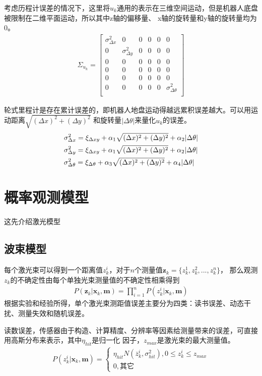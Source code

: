 \documentclass[10pt]{article}
\begin{document}
考虑历程计误差的情况下，这里将$u_k$通用的表示在三维空间运动，但是机器人底盘被限制在二维平面运动，所以其中z轴的偏移量、
x轴的旋转量和y轴的旋转量均为0。
\begin{align} 
    \Sigma_{u_k}=\left[\begin{array}{cccccc}
        \sigma_{\Delta x}^{2} & 0 & 0 & 0 & 0 & 0 \\
        0 & \sigma_{\Delta y}^{2} & 0 & 0 & 0 & 0 \\
        0 & 0 & 0 & 0 & 0 & 0 \\
        0 & 0 & 0 & 0 & 0 & 0 \\
        0 & 0 & 0 & 0 & 0 & 0 \\
        0 & 0 & 0 & 0 & 0 & \sigma_{\Delta\theta}^{2} \\
    \end{array}\right]
\end{align}

轮式里程计是存在累计误差的，即机器人地盘运动得越远累积误差越大。可以用运动距离$\sqrt{(\Delta x)^{2}+(\Delta y)^{2}}$
和旋转量$|\Delta \theta|$来量化$u_k$的误差。
\begin{align} 
    &\sigma_{\Delta x}^{2}=\xi_{\Delta xy}+\alpha_{1}\sqrt{(\Delta x)^{2}+(\Delta y)^{2}} + \alpha_{2}|\Delta \theta| \notag \\
    &\sigma_{\Delta y}^{2}=\xi_{\Delta xy}+\alpha_{1}\sqrt{(\Delta x)^{2}+(\Delta y)^{2}} + \alpha_{2}|\Delta \theta| \\
    &\sigma_{\Delta \theta}^{2}=\xi_{\Delta \theta}+\alpha_{3}\sqrt{(\Delta x)^{2}+(\Delta y)^{2}} + \alpha_{4}|\Delta \theta| \notag
\end{align}    
\section{概率观测模型} 
这先介绍激光模型
\subsection{波束模型}
每个激光束可以得到一个距离值$z_{k}^{i}$，对于$n$个测量值$\mathbf{z}_{k}=\{z_{k}^{1},z_{k}^{2},...,z_{k}^{n}\}$，
那么观测$z_k$的不确定性由每个单独光束测量值的不确定性相乘得到
\begin{align} 
    P(\mathbf{z}_k | \mathbf{x}_k,\mathbf{m})=\prod_{i=1}^{n}P(z_{k}^{i} | \mathbf{x}_k,\mathbf{m})
\end{align} 
根据实验和经验所得，单个激光束测距值误差主要分为四类：读书误差、动态干扰、测量失效和随机误差。

读数误差，传感器由于构造、计算精度、分辨率等因素给测量带来的误差，可直接用高斯分布来表示，其中$\eta_{hit}$是归一化
因子，$z_{max}$是激光束的最大测量值。
\begin{align}  
    P(z_{k}^{i} | \mathbf{x}_k,\mathbf{m}) =\left\{\begin{array}{l}\eta_{hit}N(\overline{z}_{k}^{i},
    \sigma_{hit}^{2}),0\leq z_{k}^{i} \leq z_{max} \\ 0, \text{其它} \end{array}\right.
\end{align}
\end{document}
